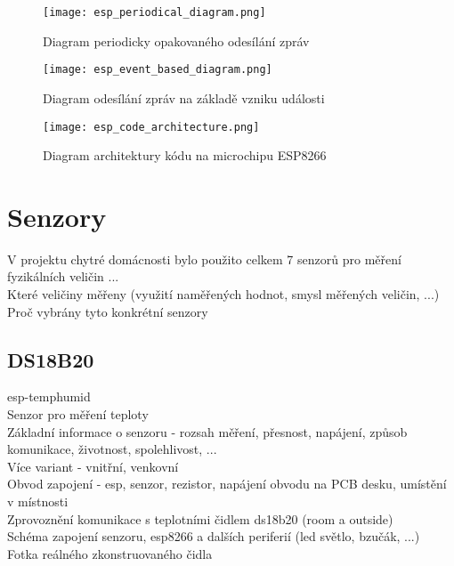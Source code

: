 \begin{figure}[H]
  \centering
  \texttt{[image: esp\_periodical\_diagram.png]}
  \caption{Diagram periodicky opakovaného odesílání zpráv}
  \label{fig:methods:transfer_functions}
\end{figure}

\begin{figure}[H]
  \centering
  \texttt{[image: esp\_event\_based\_diagram.png]}
  \caption{Diagram odesílání zpráv na základě vzniku události}
  \label{fig:methods:transfer_functions}
\end{figure}

\begin{figure}[H]
  \centering
  \texttt{[image: esp\_code\_architecture.png]}
  \caption{Diagram architektury kódu na microchipu ESP8266}
  \label{fig:methods:transfer_functions}
\end{figure}

\section{Senzory} \label{sec:example_xor}

V projektu chytré domácnosti bylo použito celkem 7 senzorů pro měření fyzikálních veličin ... \\
Které veličiny měřeny (využití naměřených hodnot, smysl měřených veličin, ...) \\
Proč vybrány tyto konkrétní senzory \\

\subsection{DS18B20}

esp-temphumid \\
Senzor pro měření teploty \\
Základní informace o senzoru - rozsah měření, přesnost, napájení, způsob komunikace, životnost, spolehlivost, ... \\
Více variant - vnitřní, venkovní \\
Obvod zapojení - esp, senzor, rezistor, napájení obvodu na PCB desku, umístění v místnosti \\
Zprovoznění komunikace s teplotními čidlem ds18b20 (room a outside) \\
Schéma zapojení senzoru, esp8266 a dalších periferií (led světlo, bzučák, ...) \\
Fotka reálného zkonstruovaného čidla \\

